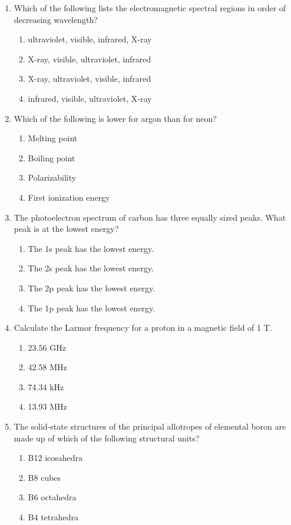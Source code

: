 \documentclass[12pt]{article}
\begin{document}
\begin{enumerate}[label=\arabic*.]
\begin{enumerate}[label=(\alph*)]
    \item 0.050 M AlCl3
    \item 0.100 M NaCl
    \item 0.050 M CaCl2
    \item 0.100 M HCl
\end{enumerate}
\item Which of the following lists the electromagnetic spectral regions in order of decreasing wavelength?
\begin{enumerate}[label=(\alph*)]
    \item ultraviolet, visible, infrared, X-ray
    \item X-ray, visible, ultraviolet, infrared
    \item X-ray, ultraviolet, visible, infrared
    \item infrared, visible, ultraviolet, X-ray
\end{enumerate}
\item Which of the following is lower for argon than for neon?
\begin{enumerate}[label=(\alph*)]
    \item Melting point
    \item Boiling point
    \item Polarizability
    \item First ionization energy
\end{enumerate}
\item The photoelectron spectrum of carbon has three equally sized peaks. What peak is at the lowest energy?
\begin{enumerate}[label=(\alph*)]
    \item The 1s peak has the lowest energy.
    \item The 2s peak has the lowest energy.
    \item The 2p peak has the lowest energy.
    \item The 1p peak has the lowest energy.
\end{enumerate}
\item Calculate the Larmor frequency for a proton in a magnetic field of 1 T.
\begin{enumerate}[label=(\alph*)]
    \item 23.56 GHz
    \item 42.58 MHz
    \item 74.34 kHz
    \item 13.93 MHz
\end{enumerate}
\item The solid-state structures of the principal allotropes of elemental boron are made up of which of the following structural units?
\begin{enumerate}[label=(\alph*)]
    \item B12 icosahedra
    \item B8 cubes
    \item B6 octahedra
    \item B4 tetrahedra
\end{enumerate}
\end{enumerate}
\end{document}
